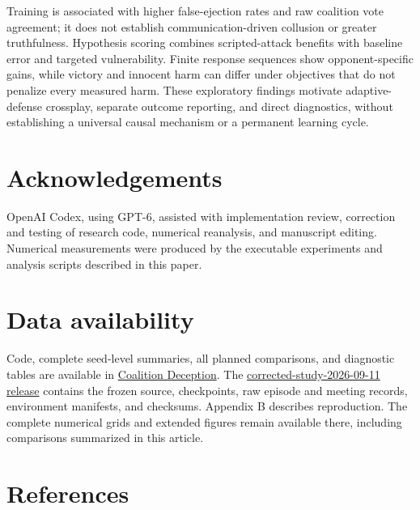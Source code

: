 \documentclass[
  12pt,
]{article}
\begin{document}
Training is associated with higher false-ejection rates and raw
coalition vote agreement; it does not establish communication-driven
collusion or greater truthfulness. Hypothesis scoring combines
scripted-attack benefits with baseline error and targeted vulnerability.
Finite response sequences show opponent-specific gains, while victory
and innocent harm can differ under objectives that do not penalize every
measured harm. These exploratory findings motivate adaptive-defense
crossplay, separate outcome reporting, and direct diagnostics, without
establishing a universal causal mechanism or a permanent learning cycle.

\FloatBarrier

\section*{Acknowledgements}\label{acknowledgements}

OpenAI Codex, using GPT-6, assisted with implementation review,
correction and testing of research code, numerical reanalysis, and
manuscript editing. Numerical measurements were produced by the
executable experiments and analysis scripts described in this paper.

\FloatBarrier

\section*{Data availability}\label{data-availability}

Code, complete seed-level summaries, all planned comparisons, and
diagnostic tables are available in
\href{https://github.com/IsaacLin247/coalition-deception}{Coalition
Deception}. The
\href{https://github.com/IsaacLin247/coalition-deception/releases/tag/corrected-study-2026-09-11}{corrected-study-2026-09-11
release} contains the frozen source, checkpoints, raw episode and
meeting records, environment manifests, and checksums. Appendix B
describes reproduction. The complete numerical grids and extended
figures remain available there, including comparisons summarized in this
article.

\FloatBarrier

\section*{References}\label{references}
\end{document}
